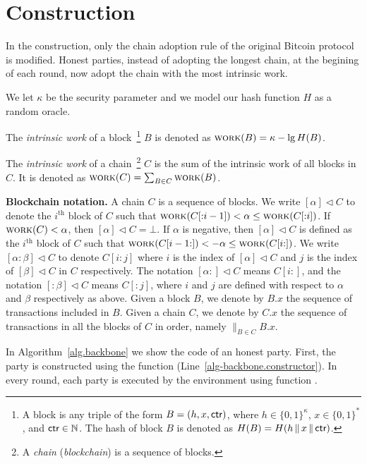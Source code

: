 \section{Construction}
In the \poem construction, only the chain adoption rule
of the original Bitcoin protocol is modified.
Honest parties, instead of adopting the longest chain, at the begining
of each round, now adopt the chain with the most intrinsic work.

We let $\kappa$ be the security parameter and we
model our hash function $H$ as a random oracle.

\begin{definition}
  The \emph{intrinsic work} of a block~\footnote{
    A block is any triple of the
    form $B = (h, x, \textsf{ctr})$, where $h \in \{0,1\}^\kappa$, $x \in \{0, 1\}^*$, and $\textsf{ctr} \in \mathbb{N}$.
    The hash of block $B$ is denoted as $H(B) = H(h \,\|\, x \,\|\, \textsf{ctr})$.
  }
  $B$ is denoted as $\textsc{work}(B) = \kappa - \lg H(B)$.
\end{definition}

\begin{definition}
  The \emph{intrinsic work} of a chain~\footnote{
    A \emph{chain} (\emph{blockchain}) is a sequence of blocks.
  }
  $C$ is the sum of the
  intrinsic work of all blocks in $C$.
  It is denoted as $\textsc{work}(C) = \sum_{B \in C}{\textsc{work}(B)}$.
\end{definition}

\noindent
\textbf{Blockchain notation.}
A chain $C$ is a sequence of blocks. We write $[\alpha] \lhd C$
to denote the $i^\text{th}$ block of $C$ such that
$\textsc{work}(C[{:}{i - 1}]) < \alpha \leq \textsc{work}(C[{:}{i}])$.
If $\textsc{work}(C) < \alpha$, then $[\alpha] \lhd C = \bot$.
If $\alpha$ is negative, then $[\alpha] \lhd C$ is defined as
the $i^\text{th}$ block of $C$ such that
$\textsc{work}(C[{i - 1}{:}]) < -\alpha \leq \textsc{work}(C[{i}{:}])$.
We write $[{\alpha}{:}{\beta}] \lhd C$ to denote
$C[{i}{:}{j}]$ where $i$ is the index of $[\alpha] \lhd C$
and $j$ is the index of $[\beta] \lhd C$ in $C$ respectively.
The notation $[{\alpha}{:}] \lhd C$ means $C[{i}{:}]$,
and the notation $[{:}\beta] \lhd C$ means $C[{:}{j}]$,
where $i$ and $j$ are defined with respect to $\alpha$ and $\beta$
respectively as above.
Given a block $B$, we denote by $B.x$ the sequence of transactions
included in $B$.
Given a chain $C$, we denote by $C.x$
the sequence of transactions in all the blocks of $C$ in order, namely
${\big\lVert}_{B \in C} B.x$.

In Algorithm~\ref{alg.backbone} we show the code of an honest party.
First, the party is constructed using the \constructor function (Line~\ref{alg-backbone.constructor}).
In every round, each party is executed by the environment using function \execute.

